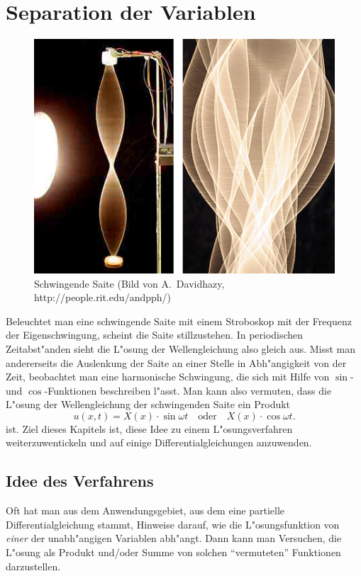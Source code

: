 %
%
%
\rhead{}
\chapter{Separation der Variablen\label{chapter-separation}}
\begin{figure}
\begin{center}
\includegraphics[width=0.8\hsize]{graphics/stringvibrlarge-10-06-06.jpg}
\end{center}
\caption{Schwingende Saite (Bild von A.~Davidhazy, http://people.rit.edu/andpph/)
\label{separation:schwingendesaite}}
\end{figure}
Beleuchtet man eine schwingende Saite mit einem Stroboskop mit der
Frequenz der Eigenschwingung, scheint die Saite stillzustehen. 
In periodischen Zeit\-ab\-st"an\-den sieht die L"osung der Wellengleichung
also gleich aus.
Misst man andererseits die Auslenkung der Saite
an einer Stelle in Abh"angigkeit von der Zeit, beobachtet man
eine harmonische Schwingung, die sich mit Hilfe von $\sin$- und
$\cos$-Funktionen beschreiben l"asst. Man kann also vermuten,
dass die L"osung der Wellengleichung der schwingenden Saite
ein Produkt
\[
u(x,t)=X(x)\cdot\sin\omega t\quad\text{oder}\quad X(x)\cdot\cos\omega t.
\]
ist. Ziel dieses Kapitels ist, diese Idee zu einem L"osungsverfahren
weiterzuwentickeln und auf einige Differentialgleichungen anzuwenden.

\section{Idee des Verfahrens}
Oft hat man aus dem Anwendungsgebiet, aus dem eine partielle
Differentialgleichung stammt, Hinweise darauf, wie die L"osungsfunktion
von {\em einer} der unabh"angigen Variablen abh"angt.
Dann kann man Versuchen, die L"osung als Produkt und/oder Summe von
solchen ``vermuteten'' Funktionen darzustellen.


